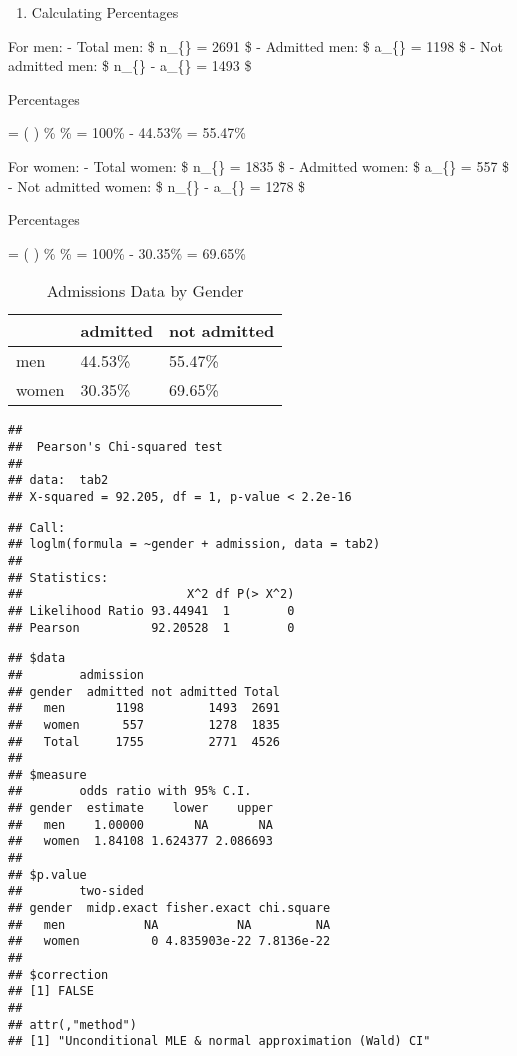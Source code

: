 \documentclass[
]{article}
\providecommand{\tightlist}{%
  \setlength{\itemsep}{0pt}\setlength{\parskip}{0pt}}
\begin{document}
\begin{enumerate}
\def\labelenumi{\arabic{enumi}.}
\tightlist
\item
  Calculating Percentages
\end{enumerate}

For men: - Total men: \$ n\_\{\} = 2691 \$ - Admitted men: \$
a\_\{\} = 1198 \$ - Not admitted men: \$ n\_\{\} -
a\_\{\} = 1493 \$

Percentages

 = \left(  \right)
\% \%  =
100\% - 44.53\% = 55.47\%

For women: - Total women: \$ n\_\{\} = 1835 \$ - Admitted
women: \$ a\_\{\} = 557 \$ - Not admitted women: \$
n\_\{\} - a\_\{\} = 1278 \$

Percentages

 = \left(  \right)
\% \%  =
100\% - 30.35\% = 69.65\%

\begin{table}

\caption{\label{tab:unnamed-chunk-8}Admissions Data by Gender}
\centering
\begin{tabular}[t]{lll}
\toprule
  & admitted & not admitted\\
\midrule
men & 44.53\% & 55.47\%\\
women & 30.35\% & 69.65\%\\
\bottomrule
\end{tabular}
\end{table}

\begin{verbatim}
## 
##  Pearson's Chi-squared test
## 
## data:  tab2
## X-squared = 92.205, df = 1, p-value < 2.2e-16
\end{verbatim}

\begin{verbatim}
## Call:
## loglm(formula = ~gender + admission, data = tab2)
## 
## Statistics:
##                       X^2 df P(> X^2)
## Likelihood Ratio 93.44941  1        0
## Pearson          92.20528  1        0
\end{verbatim}

\begin{verbatim}
## $data
##        admission
## gender  admitted not admitted Total
##   men       1198         1493  2691
##   women      557         1278  1835
##   Total     1755         2771  4526
## 
## $measure
##        odds ratio with 95% C.I.
## gender  estimate    lower    upper
##   men    1.00000       NA       NA
##   women  1.84108 1.624377 2.086693
## 
## $p.value
##        two-sided
## gender  midp.exact fisher.exact chi.square
##   men           NA           NA         NA
##   women          0 4.835903e-22 7.8136e-22
## 
## $correction
## [1] FALSE
## 
## attr(,"method")
## [1] "Unconditional MLE & normal approximation (Wald) CI"
\end{verbatim}
\end{document}
